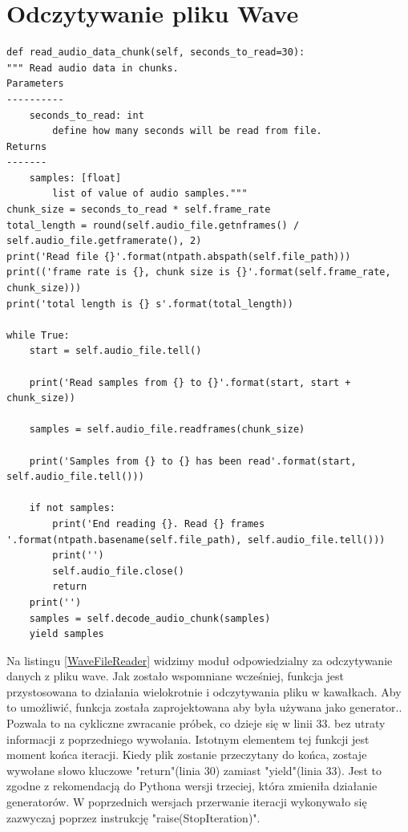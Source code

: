\documentclass[eng,printmode]{mgr}
\begin{document}
\section{Odczytywanie pliku Wave}
\begin{minipage}{\linewidth}
\begin{lstlisting}[caption={fragment kodu źródłowego pliku WaveFileReader.py},captionpos=b,label={WaveFileReader}]
def read_audio_data_chunk(self, seconds_to_read=30):
""" Read audio data in chunks.
Parameters
----------
    seconds_to_read: int
        define how many seconds will be read from file.
Returns
-------
    samples: [float]
        list of value of audio samples."""
chunk_size = seconds_to_read * self.frame_rate
total_length = round(self.audio_file.getnframes() / self.audio_file.getframerate(), 2)
print('Read file {}'.format(ntpath.abspath(self.file_path)))
print(('frame rate is {}, chunk size is {}'.format(self.frame_rate, chunk_size)))
print('total length is {} s'.format(total_length))

while True:
    start = self.audio_file.tell()

    print('Read samples from {} to {}'.format(start, start + chunk_size))
                                             
    samples = self.audio_file.readframes(chunk_size)

    print('Samples from {} to {} has been read'.format(start, self.audio_file.tell()))

    if not samples:
        print('End reading {}. Read {} frames '.format(ntpath.basename(self.file_path), self.audio_file.tell()))
        print('')
        self.audio_file.close()
        return
    print('')
    samples = self.decode_audio_chunk(samples)
    yield samples
\end{lstlisting}
\end{minipage}
Na listingu \ref{WaveFileReader} widzimy moduł odpowiedzialny za odczytywanie danych z pliku wave. Jak zostało wspomniane wcześniej, funkcja jest przystosowana to działania wielokrotnie i odczytywania pliku w kawałkach. Aby to umożliwić, funkcja została zaprojektowana aby była używana jako generator.\cite{Generator}. Pozwala to na cykliczne zwracanie próbek, co dzieje się w linii 33. bez utraty informacji z poprzedniego wywołania. Istotnym elementem tej funkcji jest moment końca iteracji. Kiedy plik zostanie przeczytany do końca, zostaje wywołane słowo kluczowe "return"(linia 30) zamiast "yield"(linia 33). Jest to zgodne z rekomendacją do Pythona wersji trzeciej,\cite{return} która zmieniła działanie generatorów. W poprzednich wersjach przerwanie iteracji wykonywało się zazwyczaj poprzez instrukcję "raise(StopIteration)". 
\end{document}
